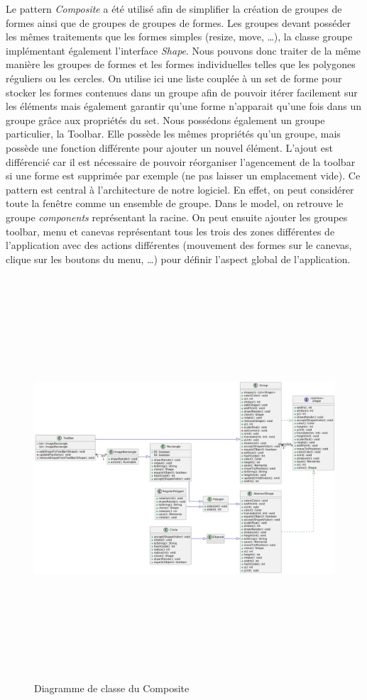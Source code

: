 \documentclass{article}
\begin{document}
Le pattern \textit{Composite} a été utilisé afin de simplifier la création de groupes de formes ainsi que de groupes de groupes de formes.
Les groupes devant posséder les mêmes traitements que les formes simples (resize, move, \ldots), la classe groupe implémentant également l'interface \textit{Shape}. Nous pouvons donc 
traiter de la même manière les groupes de formes et les formes individuelles telles que les polygones réguliers ou les cercles.  On utilise ici une liste couplée à un set de forme pour stocker
les formes contenues dans un groupe afin de pouvoir itérer facilement sur les éléments mais également garantir qu'une forme n'apparait qu'une fois dans un groupe grâce aux propriétés du set.
Nous possédons également un groupe particulier, la Toolbar. Elle possède les mêmes propriétés qu'un groupe, mais possède une fonction différente pour ajouter un nouvel élément. L'ajout est différencié
car il est nécessaire de pouvoir réorganiser l'agencement de la toolbar si une forme est supprimée par exemple (ne pas laisser un emplacement vide). Ce pattern est central à l'architecture de notre logiciel.
En effet, on peut considérer toute la fenêtre comme un ensemble de groupe. Dans le model, on retrouve le groupe \textit{components} représentant la racine. On peut ensuite ajouter les groupes toolbar, menu et
canevas représentant tous les trois des zones différentes de l'application avec des actions différentes (mouvement des formes sur le canevas, clique sur les boutons du menu, \ldots) pour définir l'aspect global de l'application. 
\begin{figure}[h]
    \centering
    \includegraphics[width=\textwidth,height=15.0cm,keepaspectratio]{Composite.png}
    \caption{Diagramme de classe du Composite}
    \label{Composite}
\end{figure}
\FloatBarrier
\end{document}

